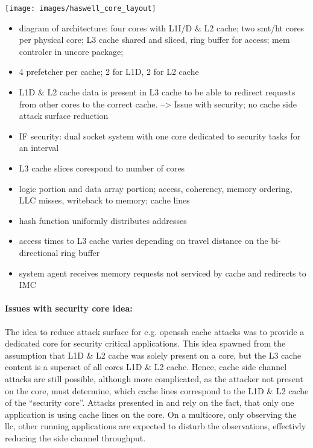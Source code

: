 \texttt{[image: images/haswell\_core\_layout]}


\begin{itemize}
  \item diagram of architecture: four cores with L1I/D \& L2 cache; two smt/ht
    cores per physical core; L3 cache shared and sliced, ring buffer for
    access; mem controler in uncore package;
  \item 4 prefetcher per cache; 2 for L1D, 2 for L2 cache
  \item L1D \& L2 cache data is present in L3 cache to be able to redirect
    requests from other cores to the correct cache. --> Issue with security; no
    cache side attack surface reduction
  \item IF security: dual socket system with one core dedicated to security
    tasks for an interval
  \item L3 cache slices corespond to number of cores
  \item logic portion and data array portion; access, coherency, memory
    ordering, LLC misses, writeback to memory; cache lines
  \item hash function uniformly distributes addresses
  \item access times to L3 cache varies depending on travel distance on the
    bi-directional ring buffer
  \item system agent receives memory requests not serviced by cache and
    redirects to IMC
\end{itemize}

\paragraph{Issues with security core idea:}
The idea to reduce attack surface for e.g. openssh cache attacks was to provide
a dedicated core for security critical applications.
This idea spawned from the assumption that L1D \& L2 cache was solely present
on a core, but the L3 cache content is a superset of all cores L1D \& L2 cache.
Hence, cache side channel attacks are still possible, although more
complicated, as the attacker not present on the core, must determine, which
cache lines correspond to the L1D \& L2 cache of the ``security core''.
Attacks presented in \cite{yarom_recovering_2014} and
\cite{bernstein_cache-timing_2005} rely on the fact, that only one application
is using cache lines on the core.
On a multicore, only observing the \gls{llc}, other running applications are
expected to disturb the observations, effectivly reducing the side channel
throughput.

